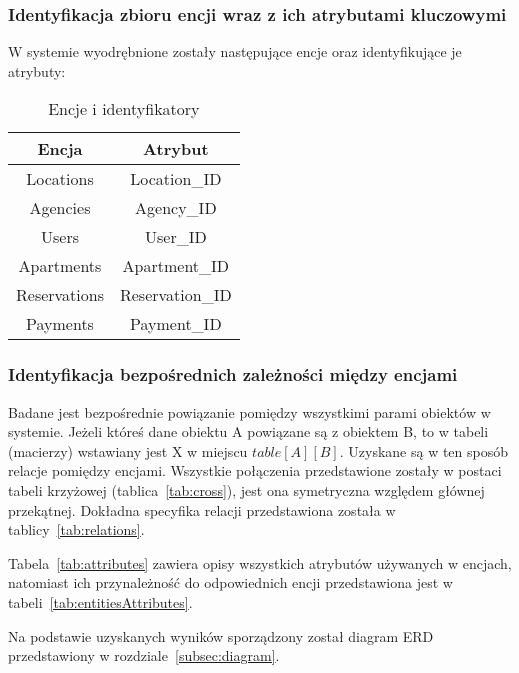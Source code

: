 \documentclass[polish, 11pt]{article}
\begin{document}
        \subsubsection{Identyfikacja zbioru encji wraz z ich atrybutami kluczowymi}
            W systemie wyodrębnione zostały następujące encje oraz identyfikujące je atrybuty:
            \begin{table}[h]
                \centering
                \caption{Encje i identyfikatory}\label{tab:entitiesID}
                \begin{tabular}{cc}\toprule
                    Encja   	    &	Atrybut	\\\midrule
                    Locations	    &	Location\_ID	\\
                    Agencies	    &	Agency\_ID	\\
                    Users   	    &	User\_ID	\\
                    Apartments	    &	Apartment\_ID	\\
                    Reservations	&	Reservation\_ID	\\
                    Payments	    &	Payment\_ID	\\
                \bottomrule
                \end{tabular}
            \end{table}

        \subsubsection{Identyfikacja bezpośrednich zależności między encjami}
            Badane jest bezpośrednie powiązanie pomiędzy wszystkimi parami obiektów w systemie.
            Jeżeli któreś dane obiektu A powiązane są z obiektem B, to w tabeli (macierzy) wstawiany jest X w miejscu \(table[A][B]\).
            Uzyskane są w ten sposób relacje pomiędzy encjami.
            Wszystkie połączenia przedstawione zostały w postaci tabeli krzyżowej (tablica~\ref{tab:cross}),
            jest ona symetryczna względem głównej przekątnej.
            Dokładna specyfika relacji przedstawiona została w tablicy~\ref{tab:relations}.

            Tabela~\ref{tab:attributes} zawiera opisy wszystkich atrybutów używanych w encjach,
            natomiast ich przynależność do odpowiednich encji przedstawiona jest w tabeli~\ref{tab:entitiesAttributes}.

            Na podstawie uzyskanych wyników sporządzony został diagram ERD przedstawiony w rozdziale~\ref{subsec:diagram}.
            
\end{document}
